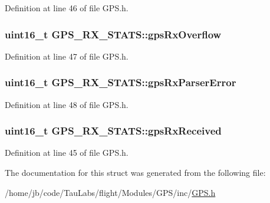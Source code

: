 \-Definition at line 46 of file \-G\-P\-S.\-h.

\hypertarget{struct_g_p_s___r_x___s_t_a_t_s_a1820743f7205c836af17a100834732b4}{
\subsubsection[{gps\-Rx\-Overflow}]{\setlength{\rightskip}{0pt plus 5cm}uint16\-\_\-t {\bf \-G\-P\-S\-\_\-\-R\-X\-\_\-\-S\-T\-A\-T\-S\-::gps\-Rx\-Overflow}}}\label{struct_g_p_s___r_x___s_t_a_t_s_a1820743f7205c836af17a100834732b4}


\-Definition at line 47 of file \-G\-P\-S.\-h.

\hypertarget{struct_g_p_s___r_x___s_t_a_t_s_a89bf9e59acfe33d00d4a319ec4f84cd7}{
\subsubsection[{gps\-Rx\-Parser\-Error}]{\setlength{\rightskip}{0pt plus 5cm}uint16\-\_\-t {\bf \-G\-P\-S\-\_\-\-R\-X\-\_\-\-S\-T\-A\-T\-S\-::gps\-Rx\-Parser\-Error}}}\label{struct_g_p_s___r_x___s_t_a_t_s_a89bf9e59acfe33d00d4a319ec4f84cd7}


\-Definition at line 48 of file \-G\-P\-S.\-h.

\hypertarget{struct_g_p_s___r_x___s_t_a_t_s_a2cc140780bc89226502f3903c38c8a30}{
\subsubsection[{gps\-Rx\-Received}]{\setlength{\rightskip}{0pt plus 5cm}uint16\-\_\-t {\bf \-G\-P\-S\-\_\-\-R\-X\-\_\-\-S\-T\-A\-T\-S\-::gps\-Rx\-Received}}}\label{struct_g_p_s___r_x___s_t_a_t_s_a2cc140780bc89226502f3903c38c8a30}


\-Definition at line 45 of file \-G\-P\-S.\-h.



\-The documentation for this struct was generated from the following file\-:\begin{DoxyCompactItemize}
\item 
/home/jb/code/\-Tau\-Labs/flight/\-Modules/\-G\-P\-S/inc/\hyperlink{_g_p_s_8h}{\-G\-P\-S.\-h}\end{DoxyCompactItemize}
